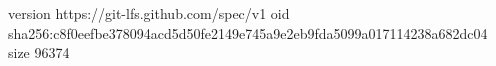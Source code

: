 version https://git-lfs.github.com/spec/v1
oid sha256:c8f0eefbe378094acd5d50fe2149e745a9e2eb9fda5099a017114238a682dc04
size 96374
